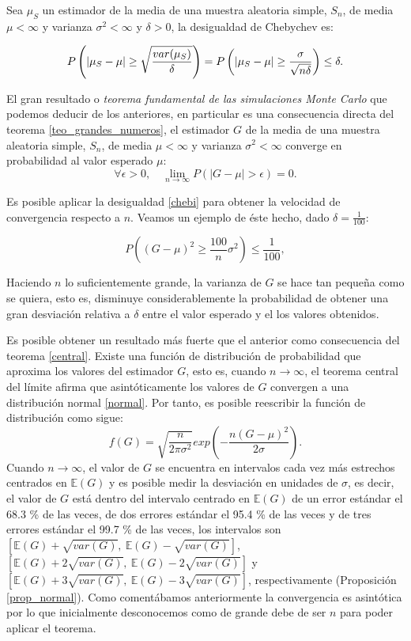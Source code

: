 \documentclass[../proyecto.tex]{memoir}
\begin{document}
\begin{defi} \label{chebi}
Sea $\mu_S$ un estimador de la media de una muestra aleatoria simple, $S_n$, de media $\mu < \infty$ y varianza $\sigma^2  < \infty$ y $\delta>0$, la desigualdad de Chebychev es:

$$
P \left( \abs{\mu_S-\mu} \geq \sqrt{\frac{var(\mu_S)}{\delta}} \right) = P \left( \abs{\mu_S-\mu} \geq \frac{\sigma}{\sqrt{n\delta}} \right)  \leq \delta.
$$

\end{defi}

El gran resultado o \textit{teorema fundamental de las simulaciones Monte Carlo} que podemos deducir de los anteriores, en particular es una consecuencia directa del teorema \ref{teo_grandes_numeros}, el estimador $G$ de la media de una muestra aleatoria simple, $S_n$, de media $\mu < \infty$ y varianza $\sigma^2 < \infty$ converge en probabilidad al valor esperado $\mu$:
$$
\forall \epsilon > 0,\quad \lim_{n\to\infty} P( |G - \mu|> \epsilon ) = 0.
$$

Es posible aplicar la desigualdad \ref{chebi} para obtener la velocidad de convergencia respecto a $n$. Veamos un ejemplo de éste hecho, dado $\delta=\frac{1}{100}$:

$$
P \left( ( G - \mu )^2 \geq \frac{100}{n} \sigma^2 \right)  \leq \frac{1}{100},
$$

Haciendo $n$ lo suficientemente grande, la varianza de $G$ se hace tan pequeña como se quiera, esto es, disminuye considerablemente la probabilidad de obtener una gran desviación relativa a $\delta$ entre el valor esperado y el los valores obtenidos.

Es posible obtener un resultado más fuerte que el anterior como consecuencia  del teorema \ref{central}. Existe una función de distribución de probabilidad que aproxima los valores del estimador $G$, esto es, cuando $n \to\infty$, el teorema central del límite afirma que asintóticamente los valores de $G$ convergen a una distribución normal \ref{normal}. Por tanto, es posible reescribir la función de distribución como sigue:
$$
f(G) = \sqrt{\frac{n}{2 \pi \sigma^2}} exp \left( - \frac{n(G-\mu)^2}{2\sigma} \right).
$$
Cuando $n \to\infty$, el valor de $G$ se encuentra en intervalos cada vez más estrechos centrados en $\mathds{E}(G)$ y es posible medir la desviación en unidades de $\sigma$, es decir, el valor de $G$ está dentro del intervalo centrado en $\mathds{E}(G)$ de un error estándar el 68.3 \% de las veces, de dos errores estándar el 95.4 \% de las veces y de tres errores estándar el 99.7 \%  de las veces, los intervalos son $[\mathds{E}(G)+\sqrt{var(G)},\ \mathds{E}(G)-\sqrt{var(G)}]$, $[\mathds{E}(G)+2\sqrt{var(G)},\ \mathds{E}(G)-2\sqrt{var(G)}]$ y $[\mathds{E}(G)+3\sqrt{var(G)},\ \mathds{E}(G)-3\sqrt{var(G)}]$, respectivamente (Proposición \ref{prop_normal}). Como comentábamos anteriormente la convergencia es asintótica por lo que inicialmente desconocemos como de grande debe de ser $n$ para poder aplicar el teorema.
\end{document}
